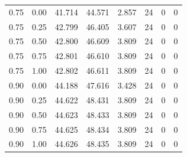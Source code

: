 \documentclass[preprint,11pt,authoryear]{elsarticle}
\begin{document}
\begin{longtable}{rrrrrrrr}
0.75 & 0.00 & 41.714 & 44.571 & 2.857 & 24 & 0 & 0\\
0.75 & 0.25 & 42.799 & 46.405 & 3.607 & 24 & 0 & 0\\
0.75 & 0.50 & 42.800 & 46.609 & 3.809 & 24 & 0 & 0\\
0.75 & 0.75 & 42.801 & 46.610 & 3.809 & 24 & 0 & 0\\
0.75 & 1.00 & 42.802 & 46.611 & 3.809 & 24 & 0 & 0\\
0.90 & 0.00 & 44.188 & 47.616 & 3.428 & 24 & 0 & 0\\
0.90 & 0.25 & 44.622 & 48.431 & 3.809 & 24 & 0 & 0\\
0.90 & 0.50 & 44.623 & 48.433 & 3.809 & 24 & 0 & 0\\
0.90 & 0.75 & 44.625 & 48.434 & 3.809 & 24 & 0 & 0\\
0.90 & 1.00 & 44.626 & 48.435 & 3.809 & 24 & 0 & 0\\
\end{longtable}\endgroup
\renewcommand{\thetable}{I2}
\end{document}
